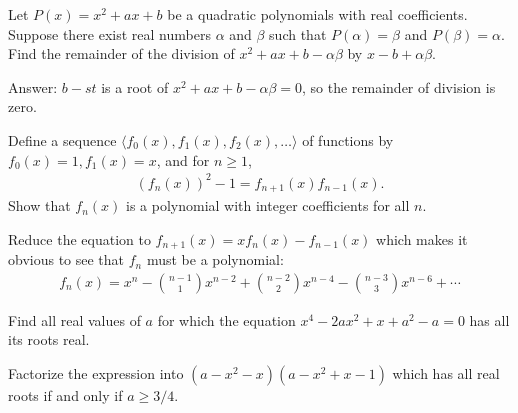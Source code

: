 \documentclass[12pt,a4paper]{memoir}
\theoremstyle{definition}
\begin{document}
\begin{tcolorbox}
	\begin{question}
		Let $P(x)=x^2+ax+b$ be a quadratic polynomials with real coefficients. Suppose there exist real numbers $\alpha$ and $\beta$ such that $P(\alpha)=\beta$ and $P(\beta)=\alpha$. Find the remainder of the division of $x^2+ax+b-\alpha\beta$ by $x-b+\alpha\beta$.
	\end{question}
\end{tcolorbox}


\begin{solution}[name=Solution by CRMO 2015]
	Answer: $b-st$ is a root of $x^2+ax+b-\alpha\beta=0$, so the remainder of division is zero.
\end{solution}



\begin{tcolorbox}
	\begin{question}
		Define a sequence $\langle f_0(x), f_1(x), f_2(x), \dots \rangle$ of functions by $f_0(x)=1, f_1(x)=x$, and for $n\geq 1$,
		\begin{align*}
			\left(f_n(x)\right)^2 - 1 = f_{n+1}(x)f_{n-1}(x).
		\end{align*}
		Show that $f_n(x)$ is a polynomial with integer coefficients for all $n$.
	\end{question}
\end{tcolorbox}


\begin{solution}[name=Solution by INMO 2012]
	Reduce the equation to $f_{n+1}(x) = xf_n(x) - f_{n-1}(x)$ which makes it obvious to see that $f_n$ must be a polynomial:
	\begin{align*}
		f_n(x) = x^n - \binom{n-1}{1} x^{n-2} + \binom{n-2}{2} x^{n-4} -\binom{n-3}{3} x^{n-6} + \cdots  
	\end{align*}
\end{solution}


\begin{tcolorbox}
	\begin{question}
		Find all real values of $a$ for which the equation $x^4-2ax^2+x+a^2-a=0$ has all its roots real.
	\end{question}
\end{tcolorbox}


\begin{solution}[name=Solution by RMO 2000]
	Factorize the expression into $(a-x^2-x)(a-x^2+x-1)$ which has all real roots if and only if $a \geq 3/4$.
\end{solution}
\end{document}
